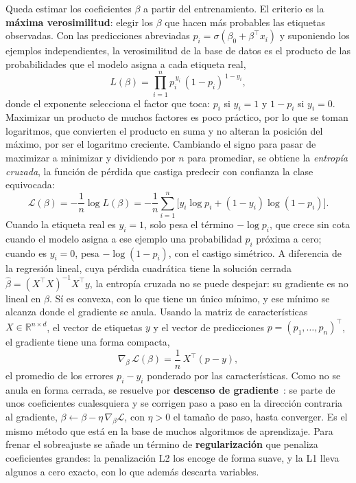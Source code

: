 \documentclass[12pt,a4paper]{report}
\theoremstyle{definition}
\begin{document}
Queda estimar los coeficientes $\beta$ a partir del entrenamiento. El criterio es la \textbf{máxima
verosimilitud}: elegir los $\beta$ que hacen más probables las etiquetas observadas. Con las
predicciones abreviadas $p_i=\sigma(\beta_0+\beta^{\top}x_i)$ y suponiendo los ejemplos independientes,
la verosimilitud de la base de datos es el producto de las probabilidades que el modelo asigna a cada
etiqueta real,
\begin{equation}
L(\beta) = \prod_{i=1}^{n} p_i^{\,y_i}\,(1-p_i)^{\,1-y_i},
\label{eq:verosim}
\end{equation}
donde el exponente selecciona el factor que toca: $p_i$ si $y_i=1$ y $1-p_i$ si $y_i=0$. Maximizar un
producto de muchos factores es poco práctico, por lo que se toman logaritmos, que convierten el producto en
suma y no alteran la posición del máximo, por ser el logaritmo creciente. Cambiando el signo para pasar de maximizar a
minimizar y dividiendo por $n$ para promediar, se obtiene la \emph{entropía cruzada}, la función de
pérdida que castiga predecir con confianza la clase equivocada:
\begin{equation}
\mathcal{L}(\beta) = -\frac{1}{n}\log L(\beta)
= -\frac{1}{n}\sum_{i=1}^{n}\Big[y_i\log p_i + (1-y_i)\log(1-p_i)\Big].
\label{eq:crossentropy}
\end{equation}
Cuando la etiqueta real es $y_i=1$, solo pesa el término $-\log p_i$, que crece sin cota cuando el
modelo asigna a ese ejemplo una probabilidad $p_i$ próxima a cero; cuando es $y_i=0$, pesa
$-\log(1-p_i)$, con el castigo simétrico. A diferencia de la regresión lineal, cuya pérdida cuadrática tiene la solución
cerrada $\hat\beta=(X^{\top}X)^{-1}X^{\top}y$, la entropía cruzada no se puede despejar: su gradiente
es no lineal en $\beta$. Sí es convexa, con lo que tiene un único mínimo, y ese mínimo se alcanza donde
el gradiente se anula. Usando la matriz de características $X\in\mathbb{R}^{n\times d}$, el vector de
etiquetas $y$ y el vector de predicciones $p=(p_1,\dots,p_n)^{\top}$, el gradiente tiene una forma
compacta,
\begin{equation}
\nabla_{\beta}\,\mathcal{L}(\beta) = \frac{1}{n}\,X^{\top}(p - y),
\label{eq:gradiente}
\end{equation}
el promedio de los errores $p_i-y_i$ ponderado por las características. Como no se anula en forma
cerrada, se resuelve por \textbf{descenso de gradiente}~\cite{cauchy1847gradient}: se parte de unos
coeficientes cualesquiera y se corrigen paso a paso en la dirección contraria al gradiente,
$\beta \leftarrow \beta - \eta\,\nabla_{\beta}\mathcal{L}$, con $\eta>0$ el tamaño de paso, hasta
converger. Es el mismo método que está en la base de muchos algoritmos de aprendizaje. Para frenar el
sobreajuste se añade un término de \textbf{regularización} que penaliza coeficientes grandes: la
penalización L2 los encoge de forma suave, y la L1 lleva algunos a cero exacto, con lo que además
descarta variables.
\end{document}
